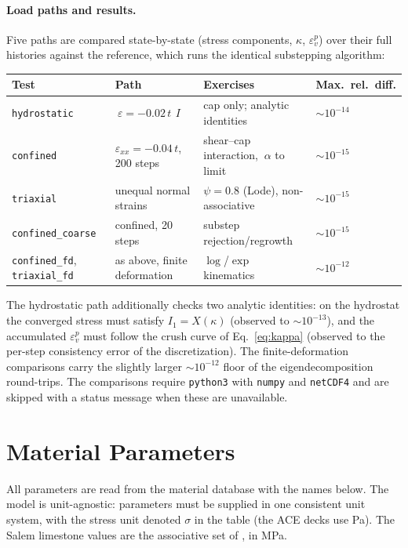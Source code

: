 \documentclass[12pt]{article}
\newcommand{\backstress}{~\alpha}
\newcommand{\ident}{~I}
\begin{document}
\paragraph{Load paths and results.}
Five paths are compared state-by-state (stress components, $\kappa$,
$\varepsilon_v^p$) over their full histories against the reference,
which runs the identical substepping algorithm:
\begin{center}
\small
\begin{tabular}{lp{3.4cm}p{4.4cm}l}
\toprule
Test & Path & Exercises & Max.\ rel.\ diff. \\
\midrule
\texttt{hydrostatic} & $~\varepsilon = -0.02\,t\,\ident$ &
  cap only; analytic identities & $\sim 10^{-14}$ \\
\texttt{confined} & $\varepsilon_{xx} = -0.04\,t$, 200 steps &
  shear--cap interaction, $\backstress$ to limit & $\sim 10^{-15}$ \\
\texttt{triaxial} & unequal normal strains &
  $\psi = 0.8$ (Lode), non-associative & $\sim 10^{-15}$ \\
\texttt{confined\_coarse} & confined, 20 steps &
  substep rejection/regrowth & $\sim 10^{-15}$ \\
\texttt{confined\_fd}, \texttt{triaxial\_fd} & as above, finite deformation &
  $\log$/$\exp$ kinematics & $\sim 10^{-12}$ \\
\bottomrule
\end{tabular}
\end{center}
The hydrostatic path additionally checks two analytic identities: on
the hydrostat the converged stress must satisfy $I_1 = X(\kappa)$
(observed to $\sim 10^{-13}$), and the accumulated
$\varepsilon_v^p$ must follow the crush curve of
Eq.~\eqref{eq:kappa} (observed to the per-step consistency error of
the discretization). The finite-deformation comparisons carry the
slightly larger $\sim 10^{-12}$ floor of the eigendecomposition
round-trips. The comparisons require \texttt{python3} with
\texttt{numpy} and \texttt{netCDF4} and are skipped with a status
message when these are unavailable.

\section{Material Parameters}
\label{sec:parameters}

All parameters are read from the material database with the names
below. The model is unit-agnostic: parameters must be supplied in one
consistent unit system, with the stress unit denoted $\sigma$ in the
table (the ACE decks use Pa). The Salem limestone values are the
associative set of \citet[Table~1]{Sun.Chen.Ostien:2014}, in MPa.
\end{document}
